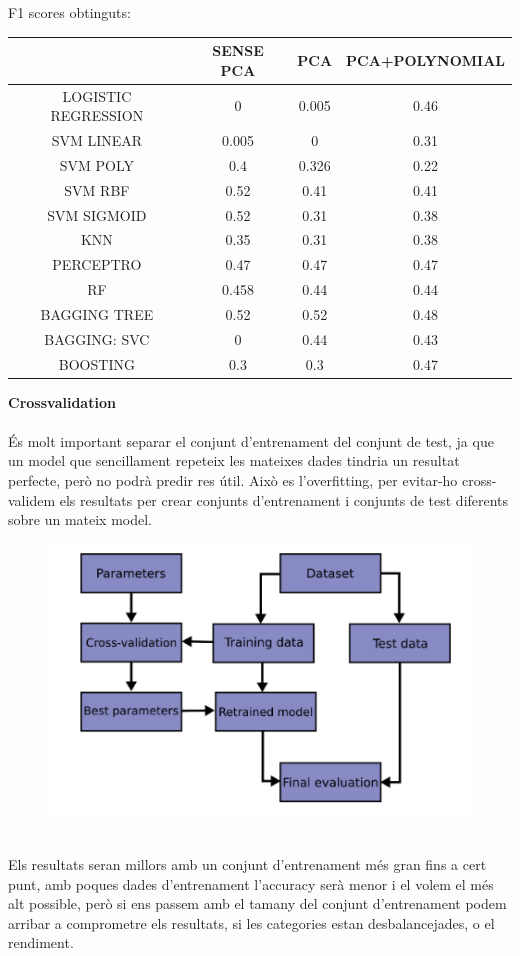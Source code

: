 \documentclass{article}
\begin{document}
F1 scores obtinguts:\\
\begin{center}
	\begin{tabular}{|c|c|c|c|}\hline
		&SENSE PCA&		PCA&		PCA+POLYNOMIAL\\ \hline
		LOGISTIC REGRESSION& 0  & 0.005	& 0.46\\ \hline
		SVM	LINEAR& 0.005	& 0		& 0.31\\ \hline
		SVM POLY& 0.4	& 0.326	& 0.22\\ \hline
		SVM RBF& 0.52	&0.41	& 0.41\\ \hline
		SVM SIGMOID& 0.52	& 0.31	& 0.38\\ \hline
		KNN& 0.35		& 0.31	& 0.38\\ \hline
		PERCEPTRO& 0.47		& 0.47	& 0.47\\ \hline
		RF& 0.458		& 0.44	& 0.44\\ \hline
		BAGGING TREE &0.52	&0.52	& 0.48\\ \hline
		BAGGING: SVC & 0	& 0.44	&0.43\\ \hline
		BOOSTING& 0.3 & 0.3 & 0.47\\ \hline
	\end{tabular}
\end{center}
	\textbf{Crossvalidation}\\
	\\
	És molt important separar el conjunt d'entrenament del conjunt de test, ja que un model que sencillament repeteix les mateixes dades tindria un resultat perfecte, però no podrà predir res útil. Això es l'overfitting, per evitar-ho cross-validem els resultats per crear conjunts d'entrenament i conjunts de test diferents sobre un mateix model.\\
	\begin{figure}[!h]
		\centering
		\includegraphics[width=0.4\linewidth]{../images/crossvalidation}
		\caption*{}
		\label{fig:crossvalidation}
	\end{figure}\\
	Els resultats seran millors amb un conjunt d'entrenament més gran fins a cert punt, amb poques dades d'entrenament l'accuracy serà menor i el volem el més alt possible, però si ens passem amb el tamany del conjunt d'entrenament podem arribar a comprometre els resultats, si les categories estan desbalancejades, o el rendiment.\\
\end{document}

